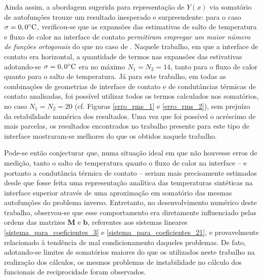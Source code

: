 Ainda assim, a abordagem sugerida para representação de $Y(x)$ via somatório de autofunções trouxe um resultado inesperado e surpreendente: para o caso $\sigma = 0,0\celsius$, verificou-se que as expansões das estimativas de salto de temperatura e fluxo de calor na interface de contato \textit{permitiram empregar um maior número de funções ortogonais} do que no caso de \cite{tese_padilha}. Naquele trabalho, em que a interface de contato era horizontal, a quantidade de termos nas expansões das estivativas adotando-se $\sigma = 0,0\celsius$ era no máximo $N_1 = N_2 = 14$, tanto para o fluxo de calor quanto para o salto de temperatura. Já para este trabalho, em todas as combinações de geometrias de interface de contato e de condutâncias térmicas de contato analisadas, foi possível utilizar todos os termos calculados nos somatórios, no caso $N_1 = N_2 = 20$ (cf. Figuras \ref{erro_rms_1} e \ref{erro_rms_2}), sem prejuízo da estabilidade numérica dos resultados. Uma vez que foi possível o acréscimo de mais parcelas, os resultados encontrados no trabalho presente para este tipo de interface mostraram-se melhores do que os obtidos naquele trabalho.

Pode-se então conjecturar que, numa situação ideal em que não houvesse erros de medição, tanto o salto de temperatura quanto o fluxo de calor na interface -- e portanto a condutância térmica de contato -- seriam mais precisamente estimados desde que fosse feita uma representação analítica das temperaturas sintéticas na interface superior através de uma aproximação em somatório das mesmas autofunções do problema inverso. Entretanto, no desenvolvimento numérico deste trabalho, observou-se que esse comportamento era diretamente influenciado pelas ordens das matrizes $\mathbf{M}$ e $\mathbf{b}$, referentes aos sistemas lineares \eqref{sistema_para_coeficientes_3} e \eqref{sistema_para_coeficientes_21}, e provavelmente relacionado à tendência de mal condicionamento daqueles problemas. De fato, adotando-se limites de somatórios maiores do que os utilizados neste trabalho na realização dos cálculos, os mesmos problemas de instabilidade no cálculo dos funcionais de reciprocidade foram observados.